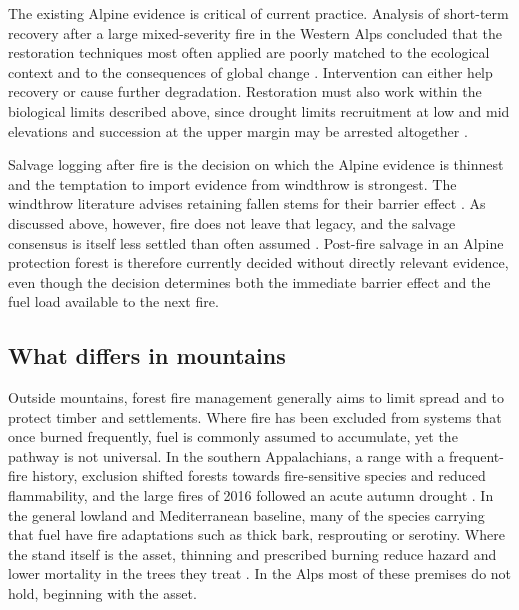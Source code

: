 \documentclass[11pt,a4paper]{article}
\begin{document}
The existing Alpine evidence is critical of current practice. Analysis of short-term recovery after a large mixed-severity fire in the Western Alps concluded that the restoration techniques most often applied are poorly matched to the ecological context and to the consequences of global change \citep{mantero_short-term_2023}. Intervention can either help recovery or cause further degradation. Restoration must also work within the biological limits described above, since drought limits recruitment at low and mid elevations \citep{moser_potential_2010} and succession at the upper margin may be arrested altogether \citep{degiuli_arrested_2024}.

Salvage logging after fire is the decision on which the Alpine evidence is thinnest and the temptation to import evidence from windthrow is strongest. The windthrow literature advises retaining fallen stems for their barrier effect \citep{costa_biological_2021}. As discussed above, however, fire does not leave that legacy, and the salvage consensus is itself less settled than often assumed \citep{seben_impact_2024}. Post-fire salvage in an Alpine protection forest is therefore currently decided without directly relevant evidence, even though the decision determines both the immediate barrier effect and the fuel load available to the next fire.

\subsection{What differs in mountains}

Outside mountains, forest fire management generally aims to limit spread and to protect timber and settlements. Where fire has been excluded from systems that once burned frequently, fuel is commonly assumed to accumulate, yet the pathway is not universal. In the southern Appalachians, a range with a frequent-fire history, exclusion shifted forests towards fire-sensitive species and reduced flammability, and the large fires of 2016 followed an acute autumn drought \citep{reilly_drivers_2022}. In the general lowland and Mediterranean baseline, many of the species carrying that fuel have fire adaptations such as thick bark, resprouting or serotiny. Where the stand itself is the asset, thinning and prescribed burning reduce hazard and lower mortality in the trees they treat \citep{brodie_forest_2024}. In the Alps most of these premises do not hold, beginning with the asset.
\end{document}
